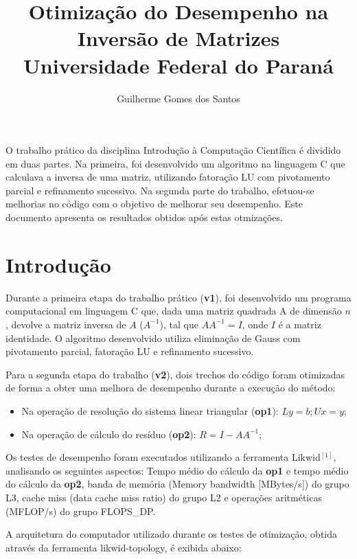 \documentclass[12pt]{article}
\title{Otimização do Desempenho na Inversão de Matrizes\\ Universidade Federal do Paraná}
\author{Guilherme Gomes dos Santos\inst{1}}
\begin{document}
\maketitle

\begin{resumo}
 O trabalho prático da disciplina Introdução à Computação Científica é dividido em duas partes. Na primeira, foi desenvolvido um algoritmo na linguagem C que calculava a inversa de uma matriz, utilizando fatoração LU com pivotamento parcial e refinamento sucessivo. Na segunda parte do trabalho, efetuou-se melhorias no código com o objetivo de melhorar seu desempenho. Este documento apresenta os resultados obtidos após estas otmizações.
\end{resumo}

\section{Introdução}
Durante a primeira etapa do trabalho prático (\textbf{v1}), foi desenvolvido um programa computacional em linguagem C que, dada uma matriz quadrada A de dimensão $n$, devolve a matriz inversa de ${A}$ (${A}^{-1}$), tal que $A {A}^{-1} = I$, onde ${I}$ é a matriz identidade. O algoritmo desenvolvido utiliza eliminação de Gauss com pivotamento parcial, fatoração LU e refinamento sucessivo.

Para a segunda etapa do trabalho (\textbf{v2}), dois trechos do código foram otimizadas de forma a obter uma melhora de desempenho durante a execução do método:
\begin{itemize}
\item Na operação de resolução do sistema linear triangular (\textbf{op1}): $Ly = b; Ux = y$;
\item Na operação de cálculo do resíduo (\textbf{op2}): $R = I - A{A}^{-1}$;
\end{itemize}

Os testes de desempenho foram executados utilizando a ferramenta {Likwid}$^{[1]}$, analisando os seguintes aspectos: Tempo médio do cálculo da \textbf{op1} e tempo médio do cálculo da \textbf{op2}, banda de memória (Memory bandwidth [MBytes/s]) do grupo L3, cache miss (data cache miss ratio) do grupo L2 e operações aritméticas (MFLOP/s) do grupo FLOPS\_DP.

A arquitetura do computador utilizado durante os testes de otimização, obtida através da ferramenta likwid-topology, é exibida abaixo:
\end{document}
